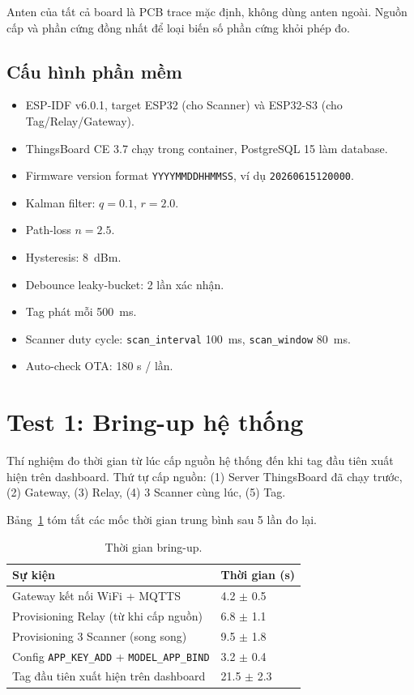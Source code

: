 Anten của tất cả board là PCB trace mặc định, không dùng anten ngoài. Nguồn cấp và phần cứng đồng nhất để loại biến số phần cứng khỏi phép đo.

\subsection{Cấu hình phần mềm}

\begin{itemize}
    \item ESP-IDF v6.0.1, target ESP32 (cho Scanner) và ESP32-S3 (cho Tag/Relay/Gateway).
    \item ThingsBoard CE 3.7 chạy trong container, PostgreSQL 15 làm database.
    \item Firmware version format \texttt{YYYYMMDDHHMMSS}, ví dụ \texttt{20260615120000}.
    \item Kalman filter: $q = 0.1$, $r = 2.0$.
    \item Path-loss $n = 2.5$.
    \item Hysteresis: 8~dBm.
    \item Debounce leaky-bucket: 2 lần xác nhận.
    \item Tag phát mỗi 500~ms.
    \item Scanner duty cycle: \texttt{scan\_interval} 100~ms, \texttt{scan\_window} 80~ms.
    \item Auto-check OTA: 180 s / lần.
\end{itemize}

\section{Test 1: Bring-up hệ thống}

Thí nghiệm đo thời gian từ lúc cấp nguồn hệ thống đến khi tag đầu tiên xuất hiện trên dashboard. Thứ tự cấp nguồn: (1) Server ThingsBoard đã chạy trước, (2) Gateway, (3) Relay, (4) 3 Scanner cùng lúc, (5) Tag.

Bảng~\ref{tab:bringup} tóm tắt các mốc thời gian trung bình sau 5 lần đo lại.

\begin{table}[htp]
    \centering
    \caption{Thời gian bring-up.}
    \label{tab:bringup}
    \begin{tabular}{ll}
        \hline
        \textbf{Sự kiện} & \textbf{Thời gian (s)} \\
        \hline
        Gateway kết nối WiFi + MQTTS & 4.2 $\pm$ 0.5 \\
        Provisioning Relay (từ khi cấp nguồn) & 6.8 $\pm$ 1.1 \\
        Provisioning 3 Scanner (song song) & 9.5 $\pm$ 1.8 \\
        Config \texttt{APP\_KEY\_ADD} + \texttt{MODEL\_APP\_BIND} & 3.2 $\pm$ 0.4 \\
        Tag đầu tiên xuất hiện trên dashboard & 21.5 $\pm$ 2.3 \\
        \hline
    \end{tabular}
\end{table}

